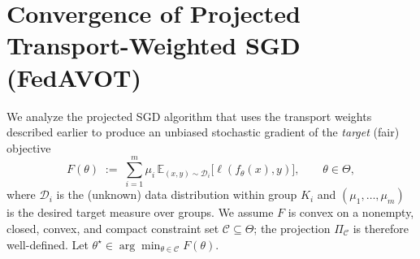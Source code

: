 \documentclass[9pt]{extarticle}
\theoremstyle{definition}
\begin{document}
\section{Convergence of Projected Transport-Weighted SGD (FedAVOT)}
We analyze the projected SGD algorithm that uses the transport weights described earlier to produce an unbiased stochastic gradient of the \emph{target} (fair) objective
\begin{equation}\label{eq:target-objective}
F(\theta) \;:=\; \sum_{i=1}^m \mu_i \,\mathbb{E}_{(x,y)\sim \mathcal{D}_i}\!\big[\ell\!\left(f_\theta(x),y\right)\big],
\qquad \theta\in\Theta,
\end{equation}
where $\mathcal{D}_i$ is the (unknown) data distribution within group $K_i$ and $(\mu_1,\dots,\mu_m)$ is the desired target measure over groups. We assume $F$ is convex on a nonempty, closed, convex, and compact constraint set $\mathcal{C}\subseteq\Theta$; the projection $\Pi_{\mathcal{C}}$ is therefore well-defined. Let $\theta^\star\in\arg\min_{\theta\in\mathcal{C}}F(\theta)$.
\end{document}
